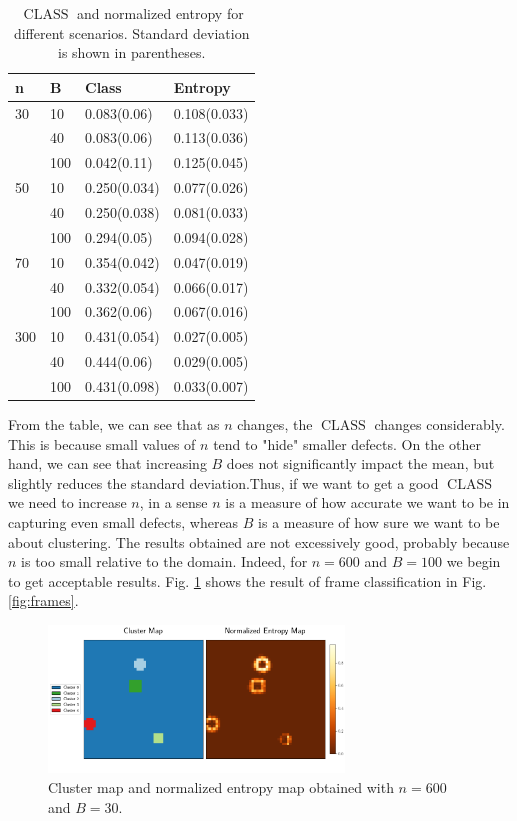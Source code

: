 \begin{table}[]
\begin{tabular}{|llll|}
\hline
\rowcolor{bluepoli!40}\textbf{n} & \textbf{B} & \textbf{Class} & \textbf{Entropy} \\ \hline
30         & 10         & 0.083(0.06)    & 0.108(0.033)     \\
           & 40         & 0.083(0.06)    & 0.113(0.036)     \\
           & 100        & 0.042(0.11)    & 0.125(0.045)     \\
50         & 10         & 0.250(0.034)   & 0.077(0.026)     \\
           & 40         & 0.250(0.038)   & 0.081(0.033)     \\
           & 100        & 0.294(0.05)    & 0.094(0.028)     \\
70         & 10         & 0.354(0.042)   & 0.047(0.019)     \\
           & 40         & 0.332(0.054)   & 0.066(0.017)     \\
           & 100        & 0.362(0.06)    & 0.067(0.016)     \\
300        & 10         & 0.431(0.054)   & 0.027(0.005)     \\
           & 40         & 0.444(0.06)    & 0.029(0.005)     \\
           & 100        & 0.431(0.098)   & 0.033(0.007)     \\ \hline
\end{tabular}
\caption{$\operatorname{CLASS}$ and normalized entropy for different scenarios. Standard deviation is shown in parentheses.}
\label{tab:result}
\end{table}
From the table, we can see that as $n$ changes, the $\operatorname{CLASS}$ changes considerably. This is because small values of $n$ tend to "hide" smaller defects. On the other hand, we can see that increasing $B$ does not significantly impact the mean, but slightly reduces the standard deviation.Thus, if we want to get a good $\operatorname{CLASS}$ we need to increase $n$, in a sense $n$ is a measure of how accurate we want to be in capturing even small defects, whereas $B$ is a measure of how sure we want to be about clustering. The results obtained are not excessively good, probably because $n$ is too small relative to the domain. Indeed, for $n=600$ and $B=100$ we begin to get acceptable results. Fig. \ref{fig:risultati} shows the result of frame classification in Fig. \ref{fig:frames}.
\begin{figure}
    \centering
    \includegraphics[width = 0.7\textwidth]{Images/final_figure_1.png}
    \caption[Bagging Voronoi Classificator maps.]{Cluster map and normalized entropy map obtained with $n=600$ and $B=30$.}
    \label{fig:risultati}
\end{figure}
